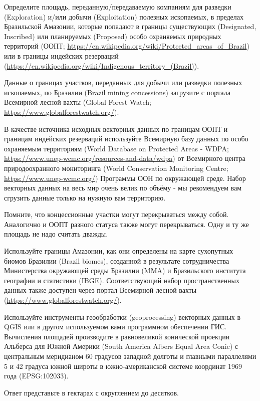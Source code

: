 
Определите площадь, переданную/передаваемую компаниям для разведки \linebreak (Exploration) 
и/или добычи (Exploitation) полезных ископаемых, в пределах Бразильской Амазонии, 
которые попадают в границы существующих (Designated, \linebreak Inscribed) или планируемых (Proposed) 
особо охраняемых природных территорий (ООПТ; \url{https://en.wikipedia.org/wiki/Protected_areas_of_Brazil}) или 
в границы индейских резерваций (\url{https://en.wikipedia.org/wiki/Indigenous_territo}\linebreak\url{ry_(Brazil)}).

Данные о границах участков, переданных для добычи или разведки полезных ископаемых, по Бразилии 
(Brazil mining concessions) загрузите с портала Всемирной лесной вахты (Global Forest Watch; \url{https://www.globalforestwatch.org/}).

В качестве источника исходных векторных данных по границам ООПТ и границам индейских резерваций используйте 
Всемирную базу данных по особо охраняемым территориям (World Database on Protected Areas - WDPA; \url{https://www.unep-wcmc.org/resources-and-data/wdpa}) 
от Всемирного центра природоохранного мониторинга (World Conservation Monitoring Centre; \url{https://www.unep-wcmc.org/}) Программы ООН по окружающей среде. Набор векторных данных на весь мир очень велик по объёму - мы рекомендуем вам сгрузить данные только на нужную вам территорию.

Помните, что концессионные участки могут перекрываться между собой. Аналогично и ООПТ разного статуса также могут перекрываться. Одну и ту же площадь не надо считать дважды.

Используйте границы Амазонии, как они определены на карте сухопутных биомов Бразилии (Brazil biomes), 
созданной в результате сотрудничества Министерства окружающей среды Бразилии (MMA) и Бразильского института 
географии и статистики (IBGE). Соответствующий набор пространственных данных также доступен через портал 
Всемирной лесной вахты (\url{https://www.globalforestwatch.org/}).

Используйте инструменты геообработки (geoprocessing) векторных данных в \linebreak QGIS или в другом используемом вами программном обеспечении ГИС. Вычисления площадей производите в равновеликой конической проекции Альберса для Южной Америки (South America Albers Equal Area Conic) с центральным меридианом 60 градусов западной долготы и главными параллелями 5 и 42 градуса южной широты в южно-американской системе координат 1969 года (EPSG:102033).

Ответ представьте в гектарах с округлением до десятков.